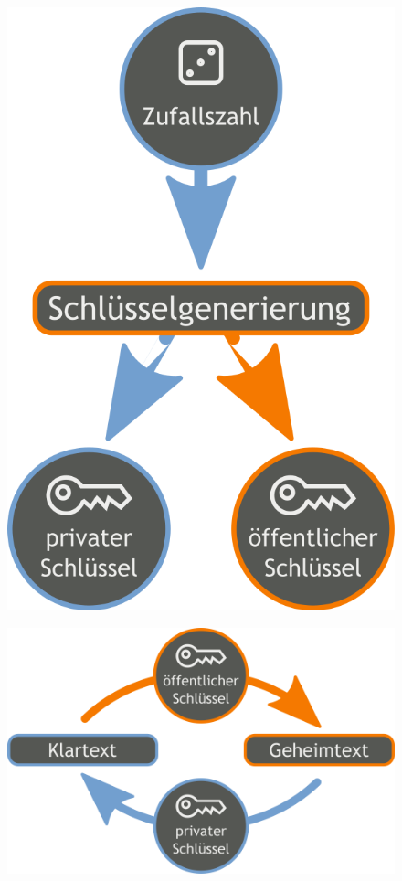 \documentclass[xcolor=dvipsnames]{beamer}
\begin{document}
\begin{frame}
	\begin{figure}
	\center
	\includegraphics[scale=0.2]{private_keygeneration}
	\end{figure}
\end{frame}
\begin{frame}
	\begin{figure}
	\center
	\includegraphics[scale=0.2]{public_key_cryptography}
	\end{figure}
\end{frame}
\end{document}

